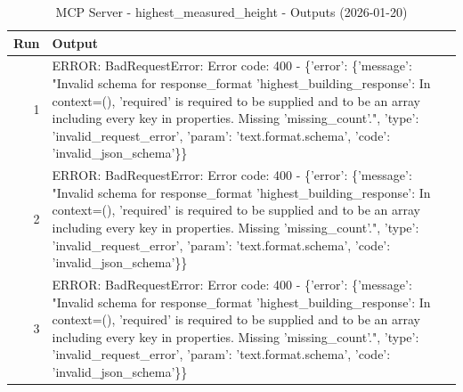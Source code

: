 \begin{table}[ht]
\centering
\small
\caption{MCP Server - highest\_measured\_height - Outputs (2026-01-20)}
\label{tab:mcp\_highest\_measured\_height\_outputs\_2026-01-20}
\begin{tabularx}{\linewidth}{r X}
\hline
Run & Output \\
\hline
1 & ERROR: BadRequestError: Error code: 400 - \{'error': \{'message': "Invalid schema for response\_format 'highest\_building\_response': In context=(), 'required' is required to be supplied and to be an array including every key in properties. Missing 'missing\_count'.", 'type': 'invalid\_request\_error', 'param': 'text.format.schema', 'code': 'invalid\_json\_schema'\}\} \\
2 & ERROR: BadRequestError: Error code: 400 - \{'error': \{'message': "Invalid schema for response\_format 'highest\_building\_response': In context=(), 'required' is required to be supplied and to be an array including every key in properties. Missing 'missing\_count'.", 'type': 'invalid\_request\_error', 'param': 'text.format.schema', 'code': 'invalid\_json\_schema'\}\} \\
3 & ERROR: BadRequestError: Error code: 400 - \{'error': \{'message': "Invalid schema for response\_format 'highest\_building\_response': In context=(), 'required' is required to be supplied and to be an array including every key in properties. Missing 'missing\_count'.", 'type': 'invalid\_request\_error', 'param': 'text.format.schema', 'code': 'invalid\_json\_schema'\}\} \\
\hline
\end{tabularx}
\end{table}

